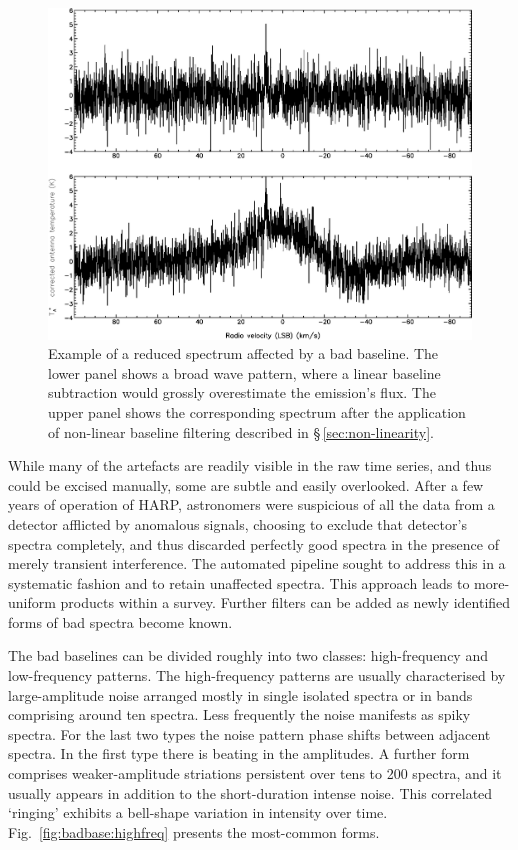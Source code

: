 \documentclass[useAMS,usenatbib]{mn2e}
\begin{document}
\begin{figure}
\includegraphics[width=\columnwidth]{badbaseline_spectrum_example}
\caption{Example of a reduced spectrum affected by a bad baseline.
  The lower panel shows a broad wave pattern, where a linear baseline
  subtraction would grossly overestimate the emission's flux.  The upper
  panel shows the corresponding spectrum after the application of
  non-linear baseline filtering described in \S\,\ref{sec:non-linearity}.}
\label{fig:badbase:spectrum}
\end{figure}


While many of the artefacts are readily visible in the raw time
series, and thus could be excised manually, some are subtle and easily
overlooked.  After a few years of operation of HARP, astronomers were
suspicious of all the data from a detector afflicted by anomalous signals,
choosing to exclude that detector's spectra completely, and thus
discarded perfectly good spectra in the presence of merely transient
interference.  The automated pipeline sought to address this
in a systematic fashion and to retain unaffected spectra.
This approach leads to more-uniform products within a survey.  Further
filters can be added as newly identified forms of bad spectra become
known.

The bad baselines can be divided roughly into two classes:
high-frequency and low-frequency patterns.  The high-frequency
patterns are usually characterised by large-amplitude noise
arranged mostly in single isolated spectra or in bands comprising
around ten spectra.  Less frequently the noise manifests as
spiky spectra.  For the last two types the noise pattern phase shifts
between adjacent spectra.  In the first type there is beating in the
amplitudes.  A further form comprises weaker-amplitude striations
persistent over tens to 200 spectra, and it usually appears in
addition to the short-duration intense noise.  This correlated
`ringing' exhibits a bell-shape variation in intensity over time.
Fig.~\ref{fig:badbase:highfreq} presents the most-common forms.
\end{document}
